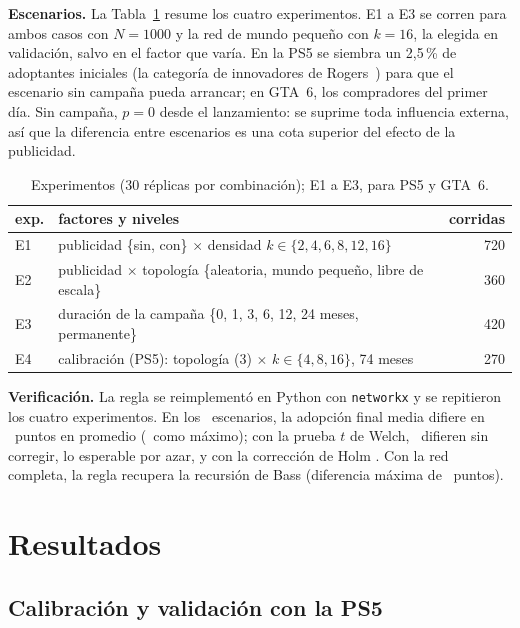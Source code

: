 \documentclass[runningheads]{llncs}
\begin{document}
\textbf{Escenarios.} La Tabla~\ref{tab:experimentos} resume los cuatro experimentos. E1 a E3 se corren para ambos casos con $N=1000$ y la red de mundo pequeño con $k=16$, la elegida en validación, salvo en el factor que varía. En la PS5 se siembra un 2,5\,\% de adoptantes iniciales (la categoría de innovadores de Rogers~\cite{rogers2003}) para que el escenario sin campaña pueda arrancar; en GTA~6, los compradores del primer día. Sin campaña, $p=0$ desde el lanzamiento: se suprime toda influencia externa, así que la diferencia entre escenarios es una cota superior del efecto de la publicidad.

\begin{table}[htb]
  \centering
  \caption{Experimentos (30 réplicas por combinación); E1 a E3, para PS5 y GTA~6.}
  \label{tab:experimentos}
  \footnotesize
  \setlength{\tabcolsep}{4pt}
  \begin{tabular}{llr}
    \toprule
    exp. & factores y niveles & corridas \\
    \midrule
    E1 & publicidad \{sin, con\} $\times$ densidad $k\in\{2,4,6,8,12,16\}$ & 720 \\
    E2 & publicidad $\times$ topología \{aleatoria, mundo pequeño, libre de escala\} & 360 \\
    E3 & duración de la campaña \{0, 1, 3, 6, 12, 24 meses, permanente\} & 420 \\
    E4 & calibración (PS5): topología (3) $\times$ $k\in\{4,8,16\}$, 74 meses & 270 \\
    \bottomrule
  \end{tabular}
\end{table}

\textbf{Verificación.} La regla se reimplementó en Python con \texttt{networkx} y se repitieron los cuatro experimentos. En los \cifraVerifEscenarios\ escenarios, la adopción final media difiere en \cifraVerifDifMedia\ puntos en promedio (\cifraVerifDifMax\ como máximo); con la prueba $t$ de Welch, \cifraVerifSignif\ difieren sin corregir, lo esperable por azar, y con la corrección de Holm \cifraVerifHolm. Con la red completa, la regla recupera la recursión de Bass (diferencia máxima de \cifraVerifBassMax\ puntos).

\section{Resultados}
\label{sec:resultados}

\subsection{Calibración y validación con la PS5}
\end{document}
